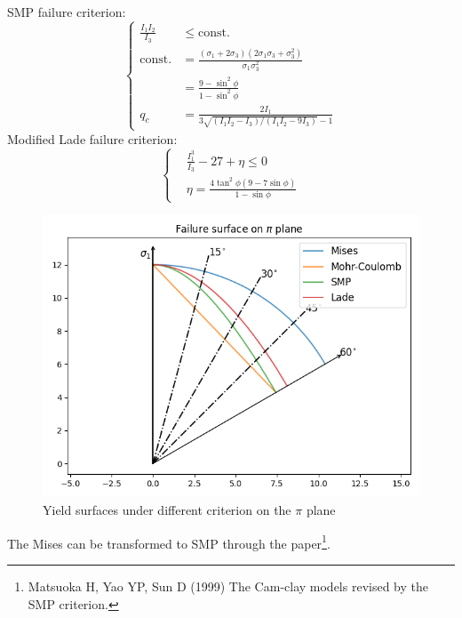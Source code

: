 \documentclass[aspectratio=169]{beamer}
\begin{document}
\begin{frame}
	\fontsize{8}{8}\selectfont
	\begin{minipage}{0.5\linewidth}
	SMP failure criterion:
	\begin{equation}
		\left \{ \begin{aligned}
			\frac{I_1I_2}{I_3} &\leq \mathrm{const.}  \\
			\mathrm{const.} &= \frac{\left(\sigma_{1}+2 \sigma_{3}\right)\left(2 \sigma_{1} \sigma_{3}+\sigma_{3}^{2}\right)}{\sigma_{1} \sigma_{3}^{2}} \\ 
			&= \frac{9-\sin^2 \phi}{1-\sin^2 \phi}\\		
			q_{c}&=\frac{2 I_{1}}{3 \sqrt{\left(I_{1} I_{2}-I_{3}\right) /\left(I_{1} I_{2}-9 I_{3}\right)}-1}
		\end{aligned}
		\right.
		\label{eq: smp criterion}
	\end{equation} 
	Modified Lade failure criterion:
	\begin{equation}
		\left \{ \begin{aligned}
			& \frac{I_1^3}{I_3} - 27+\eta \leq 0\\
			& \eta = \frac{4\tan^2 \phi (9-7\sin \phi)}{1-\sin \phi}
		\end{aligned}
		\right.
	\end{equation} 
\end{minipage}
\vspace{3mm}
\begin{minipage}{0.47\linewidth}
	\begin{figure}
		\centering
		\includegraphics[width=\linewidth]{./pic/yield surface under different criterion.png}
		\caption{Yield surfaces under different criterion on the $\pi$ plane}
		\label{fig: yield surfaces}
	\end{figure}
\end{minipage}

The Mises can be transformed to SMP through the paper\footnote{Matsuoka H, Yao YP, Sun D (1999) The Cam-clay models revised by the SMP criterion.}.
\end{frame}
\end{document}
